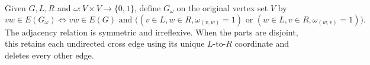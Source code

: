 \begin{definition}
Given $G,L,R$ and $\omega:V\times V\to\{0,1\}$, define $G_\omega$ on
the original vertex set $V$ by
\[
vw\in E(G_\omega)\iff vw\in E(G)\text{ and }
\bigl((v\in L,w\in R,\omega_{(v,w)}=1)
\text{ or }(w\in L,v\in R,\omega_{(w,v)}=1)\bigr).
\]
The adjacency relation is symmetric and irreflexive. When the parts are
disjoint, this retains each undirected cross edge using its unique
$L$-to-$R$ coordinate and deletes every other edge.
\end{definition}
